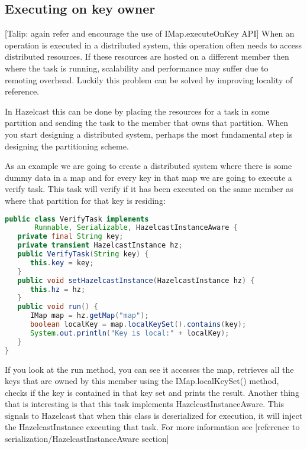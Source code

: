 \subsection{Executing on key owner}
[Talip: again refer and encourage the use of IMap.executeOnKey API]
When an operation is executed in a distributed system, this operation often needs to access distributed resources. If these resources are hosted on a different member then where the task is running, scalability and performance may suffer due to remoting overhead. Luckily this problem can be solved by improving locality of reference.

In Hazelcast this can be done by placing the resources for a task in some partition and sending the task to the member that owns that partition. When you start designing a distributed system, perhaps the most fundamental step is designing the partitioning scheme.

As an example we are going to create a distributed system where there is some dummy data in a map and for every key in that map we are going to execute a verify task. This task will verify if it has been executed on the same member as where that partition for that key is residing:
\begin{lstlisting}[language=java]
public class VerifyTask implements
       Runnable, Serializable, HazelcastInstanceAware {
   private final String key;
   private transient HazelcastInstance hz;
   public VerifyTask(String key) { 
      this.key = key;
   }
   public void setHazelcastInstance(HazelcastInstance hz) {
      this.hz = hz;
   }
   public void run() {
      IMap map = hz.getMap("map");
      boolean localKey = map.localKeySet().contains(key);
      System.out.println("Key is local:" + localKey);
   }
}
\end{lstlisting}
If you look at the run method, you can see it accesses the map, retrieves all the keys that are owned by this member using the IMap.localKeySet() method, checks if the key is contained in that key set and prints the result. Another thing that is interesting is that this task implements HazelcastInstanceAware. This signals to Hazelcast that when this class is deserialized for execution, it will inject the HazelcastInstance executing that task. For more information see [reference to serialization/HazelcastInstanceAware section]

